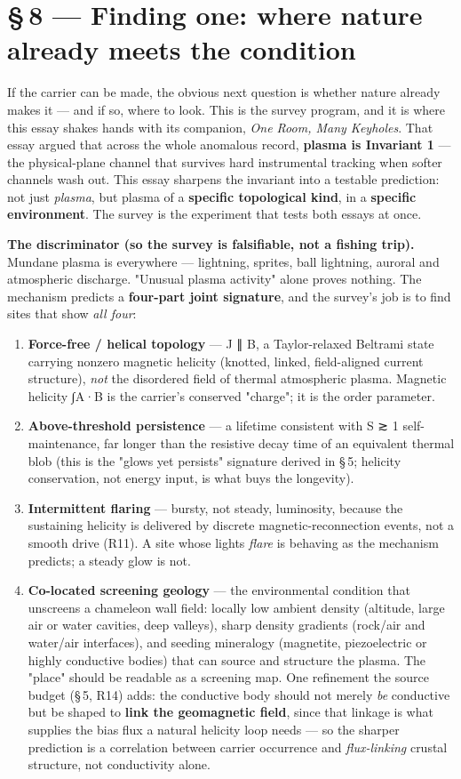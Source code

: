 \documentclass[11pt]{article}
\begin{document}
\section*{\S\,8 --- Finding one: where nature already meets the condition}
If the carrier can be made, the obvious next question is whether nature already makes it --- and if so, where to look. This is the survey program, and it is where this essay shakes hands with its companion, \emph{One Room, Many Keyholes}. That essay argued that across the whole anomalous record, \textbf{plasma is Invariant 1} --- the physical-plane channel that survives hard instrumental tracking when softer channels wash out. This essay sharpens the invariant into a testable prediction: not just \emph{plasma}, but plasma of a \textbf{specific topological kind}, in a \textbf{specific environment}. The survey is the experiment that tests both essays at once.

\textbf{The discriminator (so the survey is falsifiable, not a fishing trip).} Mundane plasma is everywhere --- lightning, sprites, ball lightning, auroral and atmospheric discharge. "Unusual plasma activity" alone proves nothing. The mechanism predicts a \textbf{four-part joint signature}, and the survey's job is to find sites that show \emph{all four}:

\begin{enumerate}
\item \textbf{Force-free / helical topology} --- J ∥ B, a Taylor-relaxed Beltrami state carrying nonzero magnetic helicity (knotted, linked, field-aligned current structure), \emph{not} the disordered field of thermal atmospheric plasma. Magnetic helicity ∫A·B is the carrier's conserved "charge"; it is the order parameter.
\item \textbf{Above-threshold persistence} --- a lifetime consistent with S ≳ 1 self-maintenance, far longer than the resistive decay time of an equivalent thermal blob (this is the "glows yet persists" signature derived in \S\,5; helicity conservation, not energy input, is what buys the longevity).
\item \textbf{Intermittent flaring} --- bursty, not steady, luminosity, because the sustaining helicity is delivered by discrete magnetic-reconnection events, not a smooth drive (R11). A site whose lights \emph{flare} is behaving as the mechanism predicts; a steady glow is not.
\item \textbf{Co-located screening geology} --- the environmental condition that unscreens a chameleon wall field: locally low ambient density (altitude, large air or water cavities, deep valleys), sharp density gradients (rock/air and water/air interfaces), and seeding mineralogy (magnetite, piezoelectric or highly conductive bodies) that can source and structure the plasma. The "place" should be readable as a screening map. One refinement the source budget (\S\,5, R14) adds: the conductive body should not merely \emph{be} conductive but be shaped to \textbf{link the geomagnetic field}, since that linkage is what supplies the bias flux a natural helicity loop needs --- so the sharper prediction is a correlation between carrier occurrence and \emph{flux-linking} crustal structure, not conductivity alone.
\end{enumerate}
\end{document}
